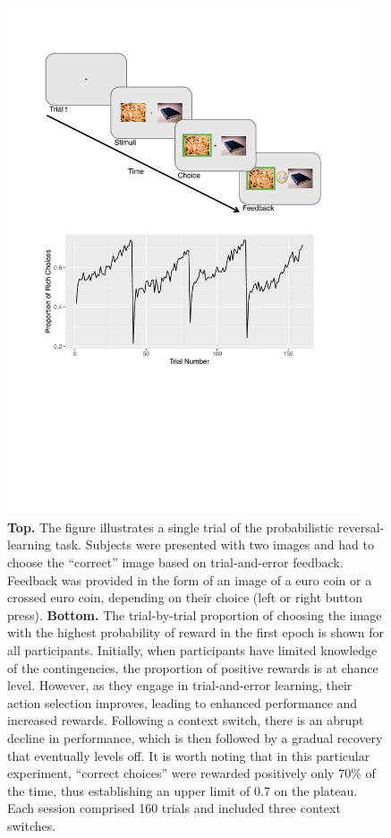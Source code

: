 \documentclass[
  man,floatsintext]{apa6}
\begin{document}
\begin{figure}

{\centering \includegraphics[width=4.17in]{img/pics/prl_task} 

}

\caption{\textbf{Top.} The figure illustrates a single trial of the probabilistic reversal-learning task. Subjects were presented with two images and had to choose the ``correct'' image based on trial-and-error feedback. Feedback was provided in the form of an image of a euro coin or a crossed euro coin, depending on their choice (left or right button press). \textbf{Bottom.} The trial-by-trial proportion of choosing the image with the highest probability of reward in the first epoch is shown for all participants. Initially, when participants have limited knowledge of the contingencies, the proportion of positive rewards is at chance level. However, as they engage in trial-and-error learning, their action selection improves, leading to enhanced performance and increased rewards. Following a context switch, there is an abrupt decline in performance, which is then followed by a gradual recovery that eventually levels off. It is worth noting that in this particular experiment, ``correct choices'' were rewarded positively only 70\% of the time, thus establishing an upper limit of 0.7 on the plateau. Each session comprised 160 trials and included three context switches.}\label{fig:prl-task}
\end{figure}
\end{document}
